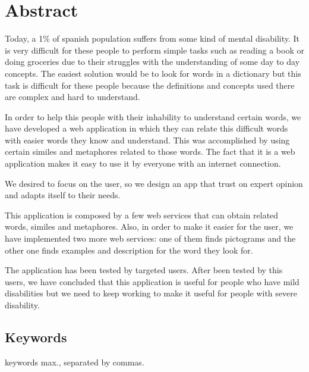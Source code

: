 \chapter*{Abstract}

Today, a 1\% of spanish population suffers from some kind of mental disability. It is very difficult for these people to perform simple tasks such as reading a book or doing groceries due to their struggles with the understanding of some day to day concepts. The easiest solution would be to look for words in a dictionary but this task is difficult for these people because the definitions and concepts used there are complex and hard to understand.

In order to help this people with their inhability to understand certain words, we have developed a web application in which they can relate this difficult words with easier words they know and understand. This was accomplished by using certain similes and metaphores related to those words. The fact that it is a web application makes it easy to use it by everyone with an internet connection.

We desired to focus on the user, so we design an app that trust on expert opinion and adapts itself to their needs.

This application is composed by a few web services that can obtain related words, similes and metaphores. Also, in order to  make it easier for the user, we have implemented two more web services: one of them finds pictograms and the other one finds examples and description for the word they look for.

The application has been tested by targeted users. After been tested by this users, we have concluded that this application is useful for people who have mild disabilities but we need to keep working to make it useful for people with severe disability.


\section*{Keywords}

 keywords max., separated by commas.



